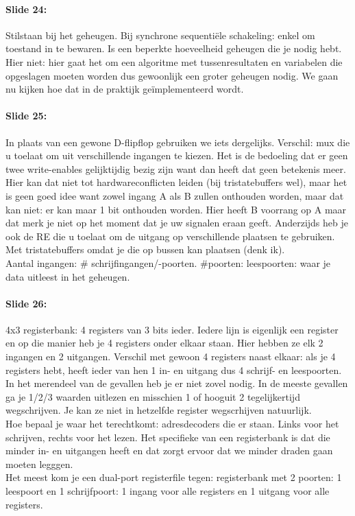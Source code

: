 \documentclass[10pt,a4paper]{book}
\begin{document}
\paragraph{Slide 24:} Stilstaan bij het geheugen. Bij synchrone sequenti\"ele schakeling: enkel om toestand in te bewaren. Is een beperkte hoeveelheid geheugen die je nodig hebt. Hier niet: hier gaat het om een algoritme met tussenresultaten en variabelen die opgeslagen moeten worden dus gewoonlijk een groter geheugen nodig. We gaan nu kijken hoe dat in de praktijk ge\"implementeerd wordt. 

\paragraph{Slide 25:} In plaats van een gewone D-flipflop gebruiken we iets dergelijks. Verschil: mux die u toelaat om uit verschillende ingangen te kiezen. Het is de bedoeling dat er geen twee write-enables gelijktijdig bezig zijn want dan heeft dat geen betekenis meer. Hier kan dat niet tot hardwareconflicten leiden (bij tristatebuffers wel), maar het is geen goed idee want zowel ingang A als B zullen onthouden worden, maar dat kan niet: er kan maar 1 bit onthouden worden. Hier heeft B voorrang op A maar dat merk je niet op het moment dat je uw signalen eraan geeft. Anderzijds heb je ook de RE die u toelaat om de uitgang op verschillende plaatsen te gebruiken. Met tristatebuffers omdat je die op bussen kan plaatsen (denk ik).\\
Aantal ingangen: \# schrijfingangen/-poorten. \#poorten: leespoorten: waar je data uitleest in het geheugen.

\paragraph{Slide 26:} 4x3 registerbank: 4 registers van 3 bits ieder. Iedere lijn is eigenlijk een register en op die manier heb je 4 registers onder elkaar staan. Hier hebben ze elk 2 ingangen en 2 uitgangen. Verschil met gewoon 4 registers naast elkaar: als je 4 registers hebt, heeft ieder van hen 1 in- en uitgang dus 4 schrijf- en leespoorten. In het merendeel van de gevallen heb je er niet zovel nodig. In de meeste gevallen ga je 1/2/3 waarden uitlezen en misschien 1 of hooguit 2 tegelijkertijd wegschrijven. Je kan ze niet in hetzelfde register wegscrhijven natuurlijk.\\
Hoe bepaal je waar het terechtkomt: adresdecoders die er staan. Links voor het schrijven, rechts voor het lezen. Het specifieke van een registerbank is dat die minder in- en uitgangen heeft en dat zorgt ervoor dat we minder draden gaan moeten legggen.\\
Het meest kom je een dual-port registerfile tegen: registerbank met 2 poorten: 1 leespoort en 1 schrijfpoort: 1 ingang voor alle registers en 1 uitgang voor alle registers.
\end{document}
